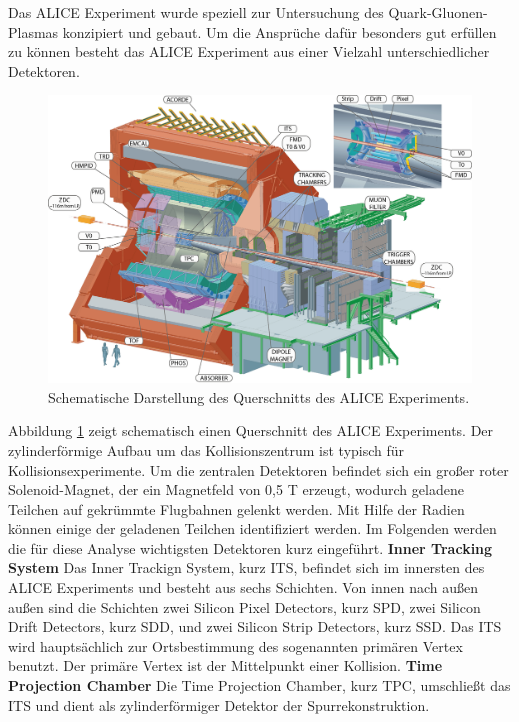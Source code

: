 Das ALICE Experiment wurde speziell zur Untersuchung des Quark-Gluonen-Plasmas konzipiert und gebaut.
Um die Anspr\"uche daf\"ur besonders gut erf\"ullen zu k\"onnen besteht das ALICE Experiment aus einer Vielzahl unterschiedlicher Detektoren.
\begin{figure}[thp]
\centering
\includegraphics[width=.9\linewidth]{ALICE.jpg}
\caption{Schematische Darstellung des Querschnitts des ALICE Experiments.
\cite{WEBSITE:1}}
\label{fig:ALICE}
\end{figure}
Abbildung \ref{fig:ALICE} zeigt schematisch einen Querschnitt des ALICE Experiments. Der zylinderf\"ormige Aufbau um das Kollisionszentrum ist typisch f\"ur Kollisionsexperimente.
\newline
Um die zentralen Detektoren befindet sich ein gro{\ss}er roter Solenoid-Magnet, der ein Magnetfeld von 0,5 T erzeugt, wodurch geladene Teilchen auf gekr\"ummte Flugbahnen gelenkt werden.
Mit Hilfe der Radien k\"onnen einige der geladenen Teilchen identifiziert werden.
Im Folgenden werden die f\"ur diese Analyse wichtigsten Detektoren kurz eingef\"uhrt.
\newline
\textbf{Inner Tracking System}
\newline
Das Inner Trackign System, kurz ITS, befindet sich im innersten des ALICE Experiments und besteht aus sechs Schichten.
Von innen nach au{\ss}en au{\ss}en sind die Schichten zwei Silicon Pixel Detectors, kurz SPD, zwei Silicon Drift Detectors, kurz SDD, und zwei Silicon Strip Detectors, kurz SSD.
Das ITS wird haupts\"achlich zur Ortsbestimmung des sogenannten prim\"aren Vertex benutzt.
Der prim\"are Vertex ist der Mittelpunkt einer Kollision.
\newline
\textbf{Time Projection Chamber}
\newline
Die Time Projection Chamber, kurz TPC, umschlie{\ss}t das ITS und dient als zylinderf\"ormiger Detektor der Spurrekonstruktion.
